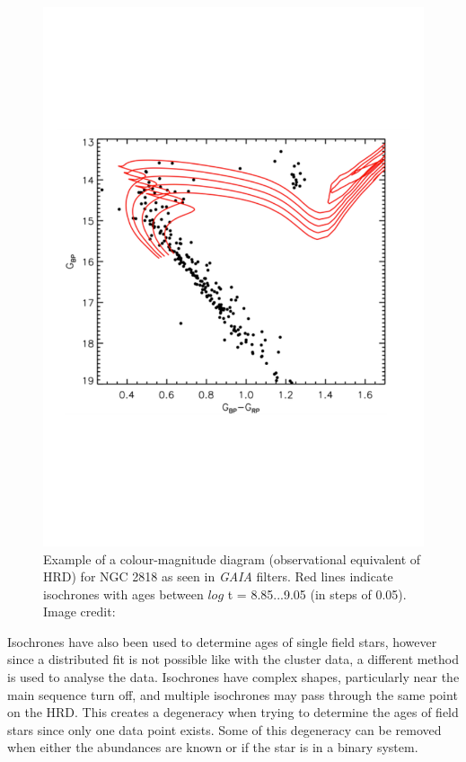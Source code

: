 \begin{figure}
    \centering
    \includegraphics[scale=0.45]{Figures/1-Introduction/gaia_OC_example.pdf}
    \caption[Example of model isochrones for a cluster]{Example of a colour-magnitude diagram (observational equivalent of HRD) for NGC 2818 as seen in \textit{GAIA} filters. Red lines indicate isochrones with ages between $log$ t = 8.85...9.05 (in steps of 0.05). Image credit: \citet{Bastian_etal_2018}}
    \label{fig:OC_isochrone_example}
\end{figure}

Isochrones have also been used to determine ages of single field stars, however since a distributed fit is not possible like with the cluster data, a different method is used to analyse the data. Isochrones have complex shapes, particularly near the main sequence turn off, and multiple isochrones may pass through the same point on the HRD. This creates a degeneracy when trying to determine the ages of field stars since only one data point exists. Some of this degeneracy can be removed when either the abundances are known or if the star is in a binary system.

